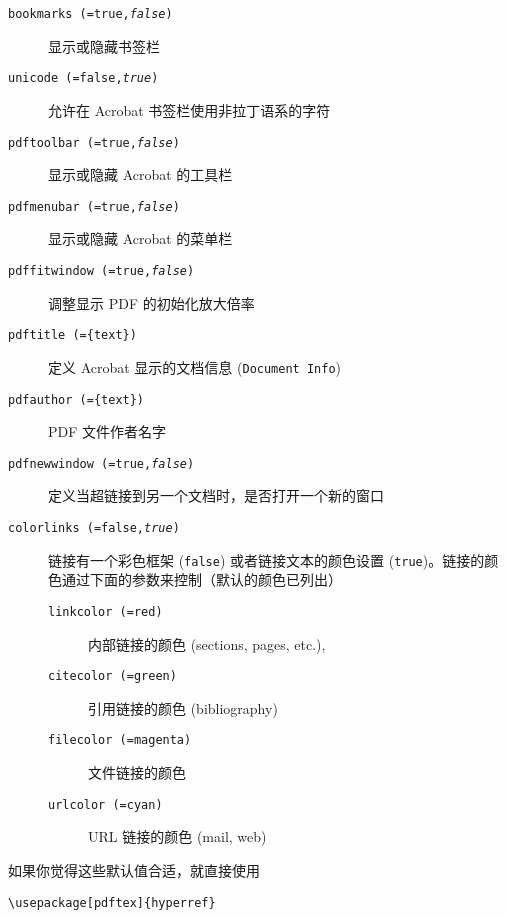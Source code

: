 \begin{flushleft}
\begin{description}
  \item [\texttt{bookmarks (=true,\textit{false})}] 显示或隐藏书签栏
  \item [\texttt{unicode (=false,\textit{true})}] 允许在 Acrobat 书签栏使用非拉丁语系的字符
  \item [\texttt{pdftoolbar (=true,\textit{false})}] 显示或隐藏 Acrobat 的工具栏
  \item [\texttt{pdfmenubar (=true,\textit{false})}] 显示或隐藏 Acrobat 的菜单栏
  \item [\texttt{pdffitwindow (=true,\textit{false})}] 调整显示 PDF 的初始化放大倍率
  \item [\texttt{pdftitle (=\{text\})}] 定义 Acrobat 显示的文档信息 (\texttt{Document
  Info})
  \item [\texttt{pdfauthor (=\{text\})}] PDF 文件作者名字
  \item [\texttt{pdfnewwindow (=true,\textit{false})}] 定义当超链接到另一个文档时，是否打开一个新的窗口
  \item [\texttt{colorlinks (=false,\textit{true})}]
  链接有一个彩色框架 (\texttt{false})   或者链接文本的颜色设置 (\texttt{true})。链接的颜色通过下面的参数来控制（默认的颜色已列出）
    \begin{description}
    \item [\texttt{linkcolor (=red)}]内部链接的颜色 (sections, pages, etc.),
    \item [\texttt{citecolor (=green)}]引用链接的颜色 (bibliography)
    \item [\texttt{filecolor (=magenta)}] 文件链接的颜色
    \item [\texttt{urlcolor (=cyan)}] URL 链接的颜色 (mail, web)
    \end{description}
\end{description}
\end{flushleft}


如果你觉得这些默认值合适，就直接使用
\begin{code}
\begin{verbatim}
\usepackage[pdftex]{hyperref}
\end{verbatim}
\end{code}

